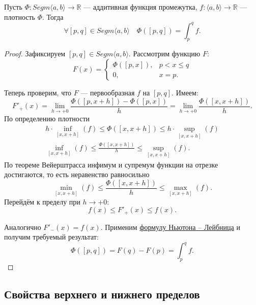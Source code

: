 \hypertarget{afp}{}
\begin{theorem}
	Пусть \(\Phi \colon Segm \langle a, b \rangle \to \mathbb{R}\) --- аддитивная функция промежутка, \(f \colon \langle a, b \rangle \to \mathbb{R}\) --- плотность \(\Phi\). Тогда \[
	\forall [p, q] \in Segm \langle a, b \rangle \quad \Phi([p, q]) = \int_p^q f.
	\]
\end{theorem}

\begin{proof}
	Зафиксируем \([p, q] \in Segm \langle a, b \rangle\). Рассмотрим функцию \(F\): \[
	F(x) =
	\begin{cases}
		\Phi([p, x]), & p < x \leqslant q \\
		0,			  & x = p.
	\end{cases}
	\]
	
	Теперь проверим, что \(F\) --- первообразная \(f\) на \([p, q]\). Имеем: \[
	F'_+(x) = \lim_{h \to +0} \frac{\Phi([p, x + h]) - \Phi([p, x])}{h} = \lim_{h \to +0} \frac{\Phi([x, x + h])}{h}.
	\]
	По определению плотности
	\begin{gather*}
		h \cdot \inf_{[x, x + h]}(f) \leqslant \Phi([x, x + h]) \leqslant h \cdot \sup_{[x, x + h]}(f) \\
		\inf_{[x, x + h]}(f) \leqslant \frac{\Phi([x, x + h])}{h} \leqslant \sup_{[x, x + h]}(f).
	\end{gather*}
	По теореме Вейерштрасса инфимум и супремум функции на отрезке достигаются, то есть неравенство равносильно \[
	\min_{[x, x + h]}(f) \leqslant \frac{\Phi([x, x + h])}{h} \leqslant \max_{[x, x + h]}(f).
	\]
	Перейдём к пределу при \(h \to +0\): \[
	f(x) \leqslant F'_+(x) \leqslant f(x).
	\]
	
	Аналогично \(F'_-(x) = f(x)\). Применим \hyperlink{t9}{формулу Ньютона -- Лейбница} и получим требуемый результат: \[
	\Phi([p, q]) = F(q) - F(p) = \int_p^q f.
	\]
\end{proof}

\subsection{Свойства верхнего и нижнего пределов}

